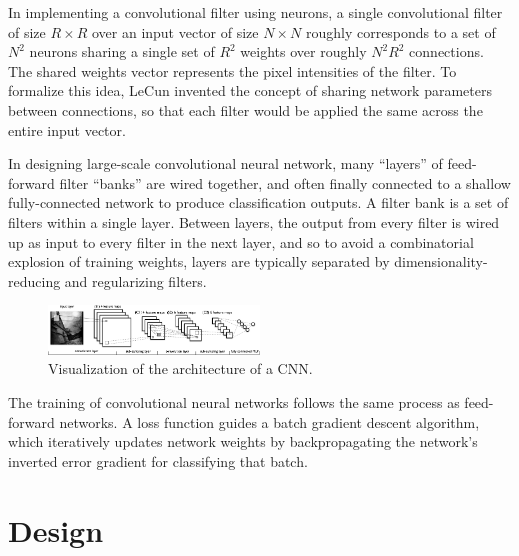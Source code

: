 \documentclass[midd]{thesis}
\begin{document}
In implementing a convolutional filter using neurons, a single convolutional filter of size $R\times R$ over an input vector of size $N\times N$ roughly corresponds to a set of $N^2$ neurons sharing a single set of $R^2$ weights over roughly $N^2R^2$ connections. The shared weights vector represents the pixel intensities of the filter. To formalize this idea, LeCun invented the concept of sharing network parameters between connections, so that each filter would be applied the same across the entire input vector.

In designing large-scale convolutional neural network, many ``layers'' of feed-forward filter ``banks'' are wired together, and often finally connected to a shallow fully-connected network to produce classification outputs. A filter bank is a set of filters within a single layer. Between layers, the output from every filter is wired up as input to every filter in the next layer, and so to avoid a combinatorial explosion of training weights, layers are typically separated by dimensionality-reducing and regularizing filters.

\begin{figure}[h]
\centering
\includegraphics[width=0.5\textwidth]{visualizations/Mylenet.png}
\caption{Visualization of the architecture of a CNN.}
\label{fig:mylenet}
\end{figure}

The training of convolutional neural networks follows the same process as feed-forward networks. A loss function guides a batch gradient descent algorithm, which iteratively updates network weights by backpropagating the network's inverted error gradient for classifying that batch.























\chapter{Design}
\end{document}
